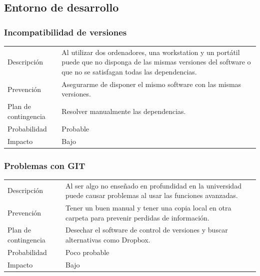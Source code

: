 \subsection{Entorno de desarrollo}
\subsubsection{Incompatibilidad de versiones}
\begin{table}[H]
    \begin{center}
        \begin{tabular}{l p{8cm}}
            Descripci\'{o}n                 & Al utilizar dos ordenadores, una workstation y un port\'{a}til puede que no 
            								  disponga de las mismas versiones del software o que no se satisfagan todas las 
            								  dependencias. \\
            Prevenci\'{o}n                  & Asegurarme de disponer el mismo software con las mismas versiones. \\ 
            Plan de contingencia            & Resolver manualmente las dependencias. \\
            Probabilidad                    & Probable \\
            Impacto                         & Bajo\\
        \end{tabular}
    \end{center}
    
\end{table}
\subsubsection{Problemas con GIT}
\begin{table}[H]
    \begin{center}
        \begin{tabular}{l p{8cm}}
            Descripci\'{o}n                 & Al ser algo no ense\~{n}ado en profundidad en la universidad puede causar problemas al 
            								  usar las funciones avanzadas. \\
            Prevenci\'{o}n                  & Tener un buen manual y tener una copia local en otra carpeta para prevenir perdidas de 
            								  informaci\'{o}n. \\ 
            Plan de contingencia            & Desechar el software de control de versiones y buscar alternativas como Dropbox. \\
            Probabilidad                    & Poco probable \\
            Impacto                         & Bajo \\
        \end{tabular}
    \end{center}  
\end{table}
